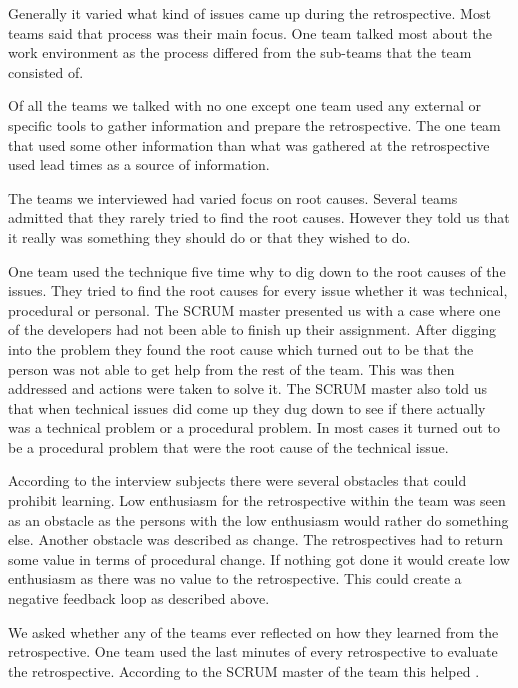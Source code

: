 Generally it varied what kind of issues came up during the retrospective. Most teams said that process was their main focus. One team talked most about the work environment as the process differed from the sub-teams that the team consisted of. 

\label{question-12}
Of all the teams we talked with no one except one team used any external or specific tools to gather information and prepare the retrospective. The one team that used some other information than what was gathered at the retrospective used lead times as a source of information. 

\label{question-13} 
The teams we interviewed had varied focus on root causes. Several teams admitted that they rarely tried to find the root causes. However they told us that it really was something they should do or that they wished to do. 

One team used the technique five time why to dig down to the root causes of the issues. They tried to find the root causes for every issue whether it was technical, procedural or personal. The SCRUM master presented us with a case where one of the developers had not been able to finish up their assignment. After digging into the problem they found the root cause which turned out to be that the person was not able to get help from the rest of the team. This was then addressed and actions were taken to solve it. The SCRUM master also told us that when technical issues did come up they dug down to see if there actually was a technical problem or a procedural problem. In most cases it turned out to be a procedural problem that were the root cause of the technical issue.

\label{question-14}
According to the interview subjects there were several obstacles that could prohibit learning. Low enthusiasm for the retrospective within the team was seen as an obstacle as the persons with the low enthusiasm would rather do something else. 
Another obstacle was described as change. The retrospectives had to return some value in terms of procedural change. If nothing got done it would create low enthusiasm as there was no value to the retrospective. This could create a negative feedback loop as described above. 

\label{question-15}
We asked whether any of the teams ever reflected on how they learned from the retrospective. One team used the last minutes of every retrospective to evaluate the retrospective. According to the SCRUM master of the team this helped . 


